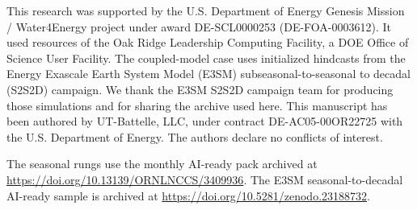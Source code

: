 \documentclass{ametsocV6.2}
\begin{document}
\clearpage
\acknowledgments
This research was supported by the U.S. Department of Energy Genesis Mission / Water4Energy project under award DE-SCL0000253 (DE-FOA-0003612).
It used resources of the Oak Ridge Leadership Computing Facility, a DOE Office of Science User Facility.
The coupled-model case uses initialized hindcasts from the Energy Exascale Earth System Model (E3SM) subseasonal-to-seasonal to decadal (S2S2D) campaign.
We thank the E3SM S2S2D campaign team for producing those simulations and for sharing the archive used here.
This manuscript has been authored by UT-Battelle, LLC, under contract DE-AC05-00OR22725 with the U.S. Department of Energy.
The authors declare no conflicts of interest.

\availstatement
The seasonal rungs use the monthly AI-ready pack archived at \url{https://doi.org/10.13139/ORNLNCCS/3409936}.
The E3SM seasonal-to-decadal AI-ready sample is archived at \url{https://doi.org/10.5281/zenodo.23188732}.

\clearpage


\end{document}
